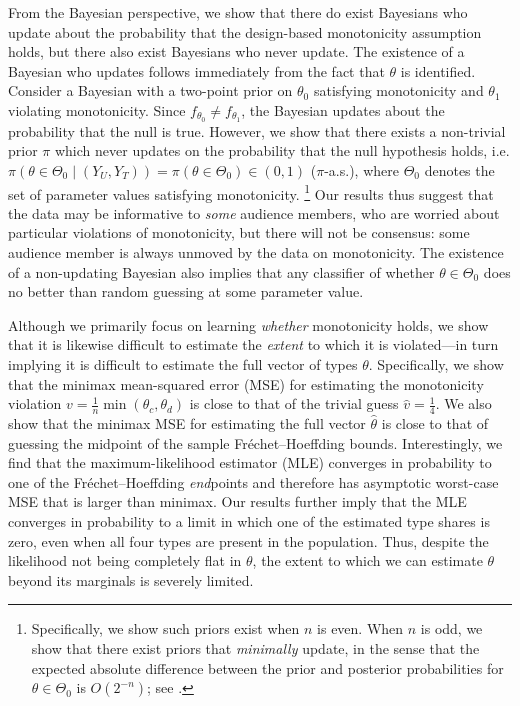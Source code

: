 \documentclass[12pt,reqno]{amsart}
\begin{document}
From the Bayesian perspective, we show that there do exist Bayesians who update about
the probability that the design-based monotonicity assumption holds, but there also exist
Bayesians who never update. The existence of a Bayesian who updates follows immediately
from the fact that $\theta$ is identified. Consider a Bayesian with a two-point prior on
$\theta_0$ satisfying monotonicity and $\theta_1$ violating monotonicity. Since
$f_{\theta_0} \neq f_{\theta_1}$, the Bayesian updates about the probability that the null
is true. However, we show that there exists a non-trivial prior $\pi$ which never
updates on the probability that the null hypothesis holds, i.e. $\pi(\theta \in \Theta_0
\mid (Y_U,Y_T) ) = \pi(\theta \in \Theta_0) \in (0,1)$ ($\pi$-a.s.), where $\Theta_0$ denotes
the set of parameter values satisfying monotonicity.%
\footnote{Specifically, we show such priors exist when $n$ is even. When $n$ is odd, we show that there exist priors that \emph{minimally} update, in the sense that the expected absolute difference between the prior and posterior probabilities for $\theta \in \Theta_0$ is $O(2^{-n})$; see .}
Our results thus suggest that the data may be
informative to \emph{some} audience members, who are worried about particular violations
of monotonicity, but there will not be consensus: some audience member is always unmoved by the data on monotonicity. The existence of a non-updating Bayesian also implies that any classifier of whether $\theta \in \Theta_0$ does no better than random guessing at some parameter value. 

Although we primarily focus on learning \emph{whether} monotonicity holds, we show that it is likewise difficult to estimate the \emph{extent} to which it is violated---in turn implying it is difficult to estimate the full vector of types $\theta$. Specifically, we show that the minimax mean-squared error (MSE) for estimating the monotonicity violation $v = \frac{1}{n} \min(\theta_c, \theta_d)$ is close to that of the trivial guess $\hat{v} = \frac{1}{4}$. We also show that the minimax MSE for estimating the full vector $\hat\theta$ is close to that of guessing the midpoint of the sample Fr\'echet--Hoeffding bounds. Interestingly, we find that the maximum-likelihood estimator (MLE) converges in probability to one of the Fr\'echet--Hoeffding \emph{end}points and therefore has asymptotic worst-case MSE that is larger than minimax. Our results further imply that the MLE converges in probability to a limit in which one of the estimated type shares is zero, even when all four types are present in the population. Thus, despite the likelihood not being completely flat in $\theta$, the extent to which we can estimate $\theta$ beyond its marginals is severely limited.
\end{document}
